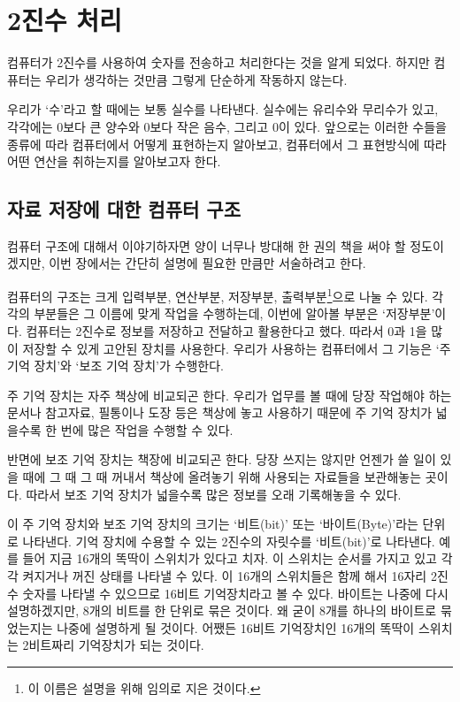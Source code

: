 \documentclass{article}
\begin{document}
\section{2진수 처리}

컴퓨터가 2진수를 사용하여 숫자를 전송하고 처리한다는 것을 알게 되었다.
하지만 컴퓨터는 우리가 생각하는 것만큼 그렇게 단순하게 작동하지 않는다.

우리가 `수'라고 할 때에는 보통 실수를 나타낸다. 실수에는 유리수와 무리수가 있고,
각각에는 0보다 큰 양수와 0보다 작은 음수, 그리고 0이 있다.
앞으로는 이러한 수들을 종류에 따라 컴퓨터에서
어떻게 표현하는지 알아보고, 컴퓨터에서 그 표현방식에 따라 어떤 연산을 취하는지를 알아보고자
한다.

\subsection{자료 저장에 대한 컴퓨터 구조}

컴퓨터 구조에 대해서 이야기하자면 양이 너무나 방대해 한 권의 책을 써야 할 정도이겠지만,
이번 장에서는 간단히 설명에 필요한 만큼만 서술하려고 한다.

컴퓨터의 구조는 크게 입력부분, 연산부분, 저장부분, 출력부분\footnote{이 이름은
설명을 위해 임의로 지은 것이다.}으로 나눌 수 있다.
각각의 부분들은 그 이름에 맞게 작업을 수행하는데, 이번에 알아볼 부분은 `저장부분'이다.
컴퓨터는 2진수로 정보를 저장하고 전달하고 활용한다고 했다. 따라서 0과 1을 많이 저장할 수 있게
고안된 장치를 사용한다. 우리가 사용하는 컴퓨터에서 그 기능은 `주 기억 장치'와 `보조 기억 장치'가
수행한다.

주 기억 장치는 자주 책상에 비교되곤 한다. 우리가 업무를 볼 때에 당장 작업해야 하는 문서나
참고자료, 필통이나 도장 등은 책상에 놓고 사용하기 때문에 주 기억 장치가 넓을수록 한 번에 많은
작업을 수행할 수 있다.

반면에 보조 기억 장치는 책장에 비교되곤 한다. 당장 쓰지는 않지만 언젠가 쓸 일이 있을 때에
그 때 그 때 꺼내서 책상에 올려놓기 위해 사용되는 자료들을 보관해놓는 곳이다. 따라서 보조 기억
장치가 넓을수록 많은 정보를 오래 기록해놓을 수 있다.

이 주 기억 장치와 보조 기억 장치의 크기는 `비트(bit)' 또는 `바이트(Byte)'라는 단위로
나타낸다. 기억 장치에 수용할 수 있는 2진수의 자릿수를 `비트(bit)'로 나타낸다. 예를 들어
지금 16개의 똑딱이 스위치가 있다고 치자. 이 스위치는 순서를 가지고 있고 각각 켜지거나
꺼진 상태를 나타낼 수 있다. 이 16개의 스위치들은 함께 해서 16자리 2진수 숫자를 나타낼 수
있으므로 16비트 기억장치라고 볼 수 있다. 바이트는 나중에 다시 설명하겠지만, 8개의 비트를
한 단위로 묶은 것이다. 왜 굳이 8개를 하나의 바이트로 묶었는지는 나중에 설명하게 될 것이다.
어쨌든 16비트 기억장치인 16개의 똑딱이 스위치는 2비트짜리 기억장치가 되는 것이다.
\end{document}
